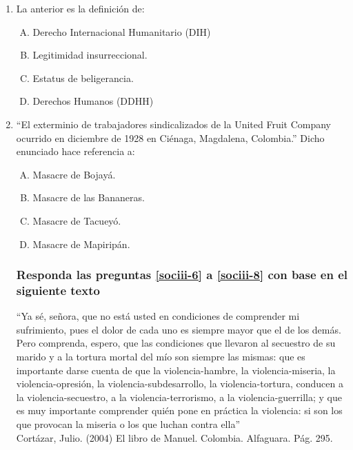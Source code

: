 \begin{enumerate}
\item La anterior es la definición de:\label{sociii-2}


\begin{enumerate}[(A)]
\item   Derecho Internacional Humanitario (DIH)
 \item  Legitimidad insurreccional.
\item Estatus de beligerancia.
\item Derechos Humanos (DDHH)
\end{enumerate}



\newpage

\item  ``El exterminio de trabajadores sindicalizados de la United Fruit Company ocurrido en diciembre de 1928 en Ciénaga, Magdalena, Colombia.'' Dicho enunciado hace referencia a:\label{sociii-5}


\begin{enumerate}[(A)]
\item   Masacre de Bojayá.
 \item  Masacre de las Bananeras.
\item Masacre de Tacueyó.
\item Masacre de Mapiripán.
\end{enumerate}



\subsubsection*{Responda las preguntas \ref{sociii-6} a \ref{sociii-8} con base en el siguiente texto}

``Ya sé, señora, que no está usted en condiciones de comprender mi sufrimiento, pues el dolor de cada uno es siempre mayor que el de los demás. Pero comprenda, espero, que las condiciones que llevaron al secuestro de su marido y a la tortura mortal del mío son siempre las mismas: que es importante darse cuenta de que la violencia-hambre, la violencia-miseria, la violencia-opresión, la violencia-subdesarrollo, la violencia-tortura, conducen a la violencia-secuestro, a la violencia-terrorismo, a la violencia-guerrilla; y que es muy importante comprender quién pone en práctica la violencia: si son los que provocan la miseria o los que luchan contra ella'' \\ {\footnotesize Cortázar, Julio. (2004) El libro de Manuel. Colombia. Alfaguara. Pág. 295.}


\end{enumerate}
